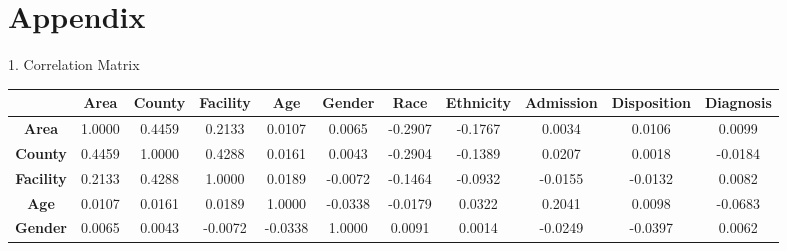\documentclass[10pt,twocolumn,letterpaper]{article}
\begin{document}
\section{Appendix}
1. Correlation Matrix
\begin{landscape}
\begin{table}[]
\begin{tabular}{|c|c|c|c|c|c|c|c|c|c|c|}
\hline
                                       & \textbf{Area} & \textbf{County} & \textbf{Facility} & \textbf{Age} & \textbf{Gender} & \textbf{Race} & \textbf{Ethnicity} & \textbf{Admission} & \textbf{Disposition} & \textbf{Diagnosis} \\ \hline
\textbf{Area}         & 1.0000                         & 0.4459                           & 0.2133                             & 0.0107                        & 0.0065                           & -0.2907                        & -0.1767                             & 0.0034                              & 0.0106                                & 0.0099                              \\ \hline
\textbf{County}       & 0.4459                         & 1.0000                           & 0.4288                             & 0.0161                        & 0.0043                           & -0.2904                        & -0.1389                             & 0.0207                              & 0.0018                                & -0.0184                             \\ \hline
\textbf{Facility}     & 0.2133                         & 0.4288                           & 1.0000                             & 0.0189                        & -0.0072                          & -0.1464                        & -0.0932                             & -0.0155                             & -0.0132                               & 0.0082                              \\ \hline
\textbf{Age}          & 0.0107                         & 0.0161                           & 0.0189                             & 1.0000                        & -0.0338                          & -0.0179                        & 0.0322                              & 0.2041                              & 0.0098                                & -0.0683                             \\ \hline
\textbf{Gender}       & 0.0065                         & 0.0043                           & -0.0072                            & -0.0338                       & 1.0000                           & 0.0091                         & 0.0014                              & -0.0249                             & -0.0397                               & 0.0062                              \\ \hline

\end{tabular}
\end{table}
\end{landscape}
\end{document}
